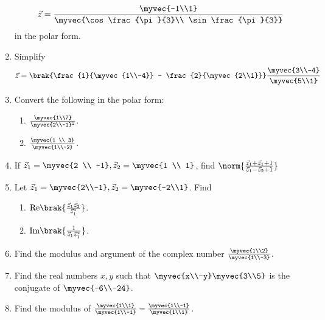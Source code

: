 \begin{enumerate}[label=\arabic*.,ref=\thesubsection.\theenumi]
\begin{align}
\vec{z} = \frac{\myvec{-1\\1}}{\myvec{\cos \frac{\pi}{3}\\ \sin\frac{\pi}{3}}}
\end{align}
%
in the polar form.
%
\item Simplify 
%
\begin{align}
\vec{z} = \brak{\frac{1}{\myvec{1\\-4}} - \frac{2}{\myvec{2\\1}}}\frac{\myvec{3\\-4}}{\myvec{5\\1}} 
\end{align}
%
\item Convert the following in the polar form:
\begin{enumerate}
\item $\frac{\myvec{1\\7}}{\myvec{2\\-1}^2}$.
\item $\frac{\myvec{1 \\ 3}}{\myvec{1\\-2}}$.
\end{enumerate}
%
\item If $\vec{z}_1 = \myvec{2 \\ -1}, \vec{z}_2 = \myvec{1 \\ 1}$, find $\norm{\frac{\vec{z}_1+\vec{z}_1+1}{\vec{z}_1-\vec{z}_2 + 1}}$
\item Let $\vec{z}_1 = \myvec{2\\-1}, \vec{z}_2 = \myvec{-2\\1}$.  Find 
\begin{enumerate}
\item $\text{Re}\brak{\frac{\vec{z}_1\vec{z}_2}{\vec{z}^{*}_1}}$.
\item $\text{Im}\brak{\frac{1}{\vec{z}_1\vec{z}^{*}_1}}$.
\end{enumerate}
%
\item Find the modulus and argument of the complex number $\frac{\myvec{1\\2}}{\myvec{1\\-3}}$.
\item Find the real numbers $x, y$ such that $\myvec{x\\-y}\myvec{3\\5}$ is the conjugate of $\myvec{-6\\-24}$.
%
\item Find the modulus of $\frac{\myvec{1\\1}}{\myvec{1\\-1}}-\frac{\myvec{1\\-1}}{\myvec{1\\1}}$.
\end{enumerate}
%

